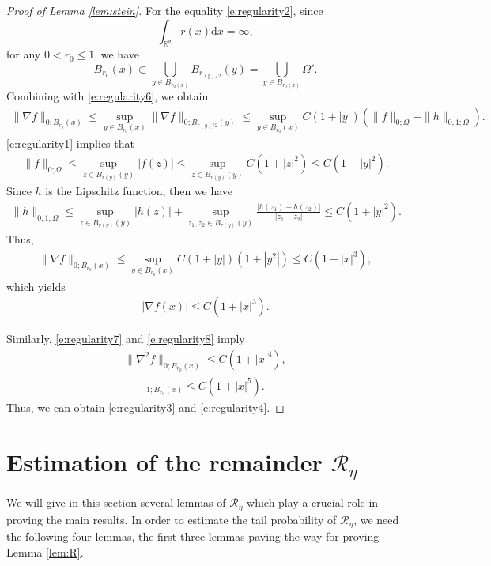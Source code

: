 \documentclass[12pt]{amsart}
\theoremstyle{definition}
\theoremstyle{remark}
\numberwithin{equation}{section}
\newcommand{\dif}{\mathrm{d}}
\newcommand{\R}{\mathbb{R}}\newcommand{\RR}{\mathbb{R}}
\newcommand{\mcl}{\mathcal}
\begin{document}
\begin{proof}[Proof of Lemma \ref{lem:stein}]
	For the equality \eqref{e:regularity2}, since 
	$$\int_{\R^d}r(x)\dif x=\infty,
	$$
	for any $0<r_0\le1$, we have 
	$$
	B_{r_0}(x)\subset \bigcup_{y\in B_{r_0(x)}} B_{r_{(y)/2}}(y)=\bigcup_{y\in B_{r_0(x)}} \Omega'.
	$$
	Combining with \eqref{e:regularity6}, we obtain
	\begin{eqnarray*}
		\| \nabla f \|_{0; B_{r_0}(x)}
		\le \sup_{y\in B_{r_0}(x)}  \| \nabla f \|_{0; B_{r(y)/2}(y)}\le \sup_{y\in B_{r_0}(x)} C(1+|y|)( \| f \|_{0; \Omega} + \|h \|_{0, 1; \Omega}).
	\end{eqnarray*}
	\eqref{e:regularity1} implies that
	\begin{eqnarray*}
		\| f \|_{0; \Omega}\le \sup_{z\in B_{r(y)}(y)}|f(z)|\le \sup_{z\in B_{r(y)}(y)}C(1+|z|^2)\le C(1+|y|^2).
	\end{eqnarray*}
	Since $h$ is the Lipschitz function, then we have
	\begin{eqnarray*}
		\| h \|_{0,1; \Omega}\le \sup_{z\in B_{r(y)}(y)}|h(z)|+\sup_{z_1,z_2\in B_{r(y)}(y)}\frac{|h(z_1)-h(z_2)|}{|z_1-z_2|}\le C(1+|y|^2).
	\end{eqnarray*}
	Thus,
	\begin{eqnarray*}
		\| \nabla f \|_{0; B_{r_0}(x)}
		\le \sup_{y\in B_{r_0}(x)} C(1+|y|)( 1+|y^2|)\le C(1+|x|^3),
	\end{eqnarray*}
	which yields
	\begin{eqnarray*}
		| \nabla f(x) | \le C(1+|x|^3).
	\end{eqnarray*}
	
	Similarly, \eqref{e:regularity7} and \eqref{e:regularity8} imply
	\begin{eqnarray*}
		\| \nabla^2 f \|_{0; B_{r_0}(x)} \le C(1+|x|^4),
	\end{eqnarray*}
	\begin{eqnarray*}
		[\nabla^2 f ]_{1; B_{r_0}(x)} \le C(1+|x|^5).
	\end{eqnarray*}
	Thus, we can obtain \eqref{e:regularity3} and \eqref{e:regularity4}.
\end{proof}

\section{Estimation of the remainder $\mcl R_\eta$}\label{appen:3}
We will give in this section several lemmas of $\mcl R_\eta$ which play a crucial role in proving the main results. In order to estimate the tail probability of $\mathcal{R}_\eta$, we need the following four lemmas, the first three lemmas paving the way for proving Lemma \ref{lem:R}.
\end{document}
